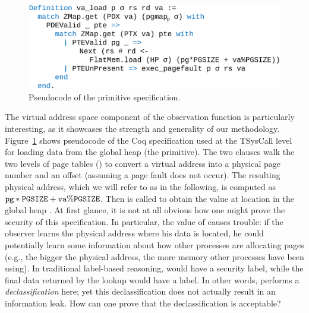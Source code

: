 \begin{figure}[t]
\begin{center}
\includegraphics[scale=0.55]{pldi/figure/vaload}
\caption{\small Pseudocode of the  primitive
specification.}
\label{fig:va-load}
\end{center}
\end{figure}

The virtual address space component of the observation 
function is particularly interesting, as it showcases the
strength and generality of our methodology. Figure~\ref{fig:va-load}
shows pseudocode of the Coq specification used at the TSysCall 
level for loading data from the global heap (the 
primitive). The two  clauses walk the two levels
of page tables () to convert a virtual address  
into a physical page number  and an offset
(assuming a page fault does not occur). The resulting
physical address, which we will refer to as  in the
following, is computed as $\text{\tt{pg}}*\text{\tt{PGSIZE}} + \text{\tt{va}}\%\text{\tt{PGSIZE}}$.
Then  is called to obtain the value at location 
 in the global heap . At first glance, it is
not at all obvious how one might prove the security of this 
specification. In particular, the value of  causes
trouble: if the observer learns the physical address where his
data is located, he could potentially learn some information
about how other processes are allocating pages (e.g.,
the bigger the physical address, the more memory other processes
have been using). In traditional label-based reasoning, 
would have a \hi{} security label, while the final data returned 
by the  lookup would have a \lo{} label. In other
words,  performs a \emph{declassification} here;
yet this declassification does not actually result in an information
leak. How can one prove that the declassification is acceptable?


